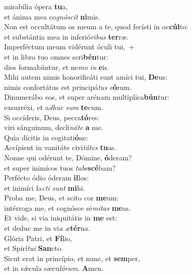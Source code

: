 \oddverse  mirabília ópera \textbf{tu}a,~\*\\
\oddverse et ánima mea co\textit{gnó}\textit{scit} \textbf{ni}mis.\\
\evenverse Non est occultátum os meum a te, quod fecísti in oc\textbf{cúl}to:~\*\\
\evenverse et substántia mea in inferió\textit{ri}\textit{bus} \textbf{ter}ræ.\\
\oddverse Imperféctum meum vidérunt óculi tui,~+\\
\oddverse  et in libro tuo omnes scri\textbf{bén}tur:~\*\\
\oddverse dies formabúntur, et ne\textit{mo} \textit{in} \textbf{e}is.\\
\evenverse Mihi autem nimis honorificáti sunt amíci tui, \textbf{De}us:~\*\\
\evenverse nimis confortátus est principá\textit{tus} \textit{e}\textbf{ó}rum.\\
\oddverse Dinumerábo eos, et super arénam multiplica\textbf{bún}tur:~\*\\
\oddverse exsurréxi, et a\textit{dhuc} \textit{sum} \textbf{te}cum.\\
\evenverse Si occíderis, Deus, pecca\textbf{tó}res:~\*\\
\evenverse viri sánguinum, decli\textit{ná}\textit{te} \textbf{a} me.\\
\oddverse Quia dícitis in cogitati\textbf{ó}ne:~\*\\
\oddverse Accípient in vanitáte civi\textit{tá}\textit{tes} \textbf{tu}as.\\
\evenverse Nonne qui odérunt te, Dómine, \textbf{ó}deram?~\*\\
\evenverse et super inimícos tuos \textit{ta}\textit{be}\textbf{scé}bam?\\
\oddverse Perfécto ódio óderam \textbf{il}los:~\*\\
\oddverse et inimíci fa\textit{cti} \textit{sunt} \textbf{mi}hi.\\
\evenverse Proba me, Deus, et scito cor \textbf{me}um:~\*\\
\evenverse intérroga me, et cognósce sé\textit{mi}\textit{tas} \textbf{me}as.\\
\oddverse Et vide, si via iniquitátis in \textbf{me} est:~\*\\
\oddverse et deduc me in vi\textit{a} \textit{æ}\textbf{tér}na.\\
\evenverse Glória Patri, et \textbf{Fí}lio,~\*\\
\evenverse et Spirí\textit{tu}\textit{i} \textbf{San}cto.\\
\oddverse Sicut erat in princípio, et nunc, et \textbf{sem}per,~\*\\
\oddverse et in sǽcula sæcu\textit{ló}\textit{rum}. \textbf{A}men.\\
